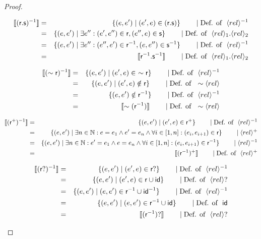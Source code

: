 \documentclass[a4paper,twoside,12pt, english]{article}
\begin{document}
\begin{appendix}
\begin{proof}
\begin{description}
\begin{eqnarray*}
\semsof{(\relr.\rels)^{-1}} &=& \{(e,e') \mid (e',e) \in (\relr.\rels)\} \reason{\defof \rel^\inv}\\
&=& \{(e,e') \mid \exists e'': (e',e'') \in \relr, (e'',e) \in \rels \} \reason{\defof \rel_1.\rel_2}\\
&=& \{(e,e') \mid \exists e'': (e'',e') \in \relr^{-1}, (e,e'') \in \rels^{-1}\} \reason{\defof \rel^\inv} \\
&=& \semsof{\relr^{-1}.\rels^{-1}} \reason{\defof \rel_1.\rel_2}
\end{eqnarray*}
\item[Case $(\sim \relr)^\inv$:]
\begin{eqnarray*}
\semsof{(\sim \relr)^{-1}} &=& \{(e,e') \mid (e',e) \in~ \sim \relr\} \reason{\defof \rel^\inv} \\
&=& \{(e,e') \mid (e',e) \notin \relr\} \reason{\defof \sim \rel}\\
&=& \{(e,e') \notin \relr^{-1}\} \reason{\defof \rel^\inv}\\
&=& \semsof{\sim (\relr^{-1})} \reason{\defof \sim \rel}
\end{eqnarray*}
\item[Case $(\relr^+)^\inv$:]\begin{eqnarray*}
\semsof{(\relr^+)^{-1}} &=& \{(e,e') \mid (e',e) \in \relr^+\} \reason{\defof \rel^\inv} \\
&=& \{(e,e') \mid \exists n \in \N: e=e_1 \land e'=e_n \land \forall i \in [1,n]:(e_i,e_{i+1}) \in \relr\} \reason{ \rel^+}\\
&=& \{(e,e') \mid \exists n \in \N: e'=e_1 \land e=e_n \land \forall i \in [1,n]:(e_i,e_{i+1}) \in \relr^\inv\} \reason{ \rel^\inv} \\
&=& \semsof{(\relr^{-1})^+} \reason{\defof \rel^+}
\end{eqnarray*}
\item[Case $(\relr?)^\inv$:]\begin{eqnarray*}
\semsof{(\relr?)^{-1}} &=& \{(e,e') \mid (e',e) \in \relr?\} \reason{\defof \rel^\inv} \\
&=& \{(e,e') \mid (e',e) \in \relr \cup \id \} \reason{\defof \rel ?} \\
&=& \{(e,e') \mid \edgein \relr^{-1} \cup \id^{-1}\} \reason{\defof \rel^\inv} \\
&=& \{(e,e') \mid \edgein \relr^{-1} \cup \id\} \reason{\defof \id} \\
&=& \semsof{(\relr^{-1})?} \reason{\defof \rel?}
\end{eqnarray*}

\end{description}
\end{proof}
\end{appendix}
\end{document}
